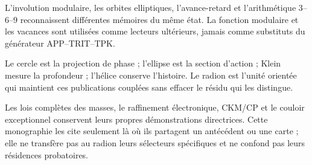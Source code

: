 \begin{narrativebox}[title={Caractères modulaire, orbital et arithmétique de frontière}]
L'involution modulaire, les orbites elliptiques, l'avance-retard et l'arithmétique
3--6--9 reconnaissent différentes mémoires du même état. La fonction modulaire et
les vacances sont utilisées comme lecteurs ultérieurs, jamais comme substituts du
générateur APP--TRIT--TPK.
\end{narrativebox}

\begin{thesisbox}[title={Synthèse opératoire de phase, d'action, de profondeur et de mémoire}]
Le cercle est la projection de phase ; l'ellipse est la section d'action ; Klein
mesure la profondeur ; l'hélice conserve l'histoire. Le radion est l'unité
orientée qui maintient ces publications couplées sans effacer le résidu qui
les distingue.
\end{thesisbox}

\begin{statusbox}[title={Délimitation des domaines et continuité causale}]
Les lois complètes des masses, le raffinement électronique, CKM/CP et le
couloir exceptionnel conservent leurs propres démonstrations directrices. Cette monographie les
cite seulement là où ils partagent un antécédent ou une carte ; elle ne transfère pas au radion leurs
sélecteurs spécifiques et ne confond pas leurs résidences probatoires.
\end{statusbox}
